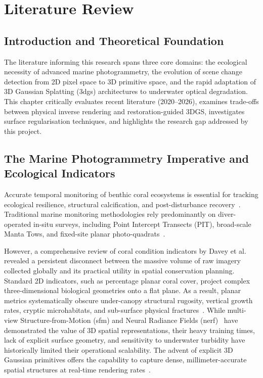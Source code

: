 
\chapter{Literature Review}
\label{chap:lit_review}

\section{Introduction and Theoretical Foundation}
\label{sec:lit_intro}
The literature informing this research spans three core domains: the ecological necessity of advanced marine photogrammetry, the evolution of scene change detection from 2D pixel space to 3D primitive space, and the rapid adaptation of 3D Gaussian Splatting (\gls{3dgs}) architectures to underwater optical degradation. This chapter critically evaluates recent literature (2020–2026), examines trade-offs between physical inverse rendering and restoration-guided 3DGS, investigates surface regularisation techniques, and highlights the research gap addressed by this project.

\section{The Marine Photogrammetry Imperative and Ecological Indicators}
\label{sec:lit_marine}
Accurate temporal monitoring of benthic coral ecosystems is essential for tracking ecological resilience, structural calcification, and post-disturbance recovery~\cite{souter2020status}. Traditional marine monitoring methodologies rely predominantly on diver-operated in-situ surveys, including Point Intercept Transects (PIT), broad-scale Manta Tows, and fixed-site planar photo-quadrats~\cite{icri2021monitoring}. 

However, a comprehensive review of coral condition indicators by Davey et al.~\cite{davey2025review} revealed a persistent disconnect between the massive volume of raw imagery collected globally and its practical utility in spatial conservation planning. Standard 2D indicators, such as percentage planar coral cover, project complex three-dimensional biological geometries onto a flat plane. As a result, planar metrics systematically obscure under-canopy structural rugosity, vertical growth rates, cryptic microhabitats, and sub-surface physical fractures~\cite{davey2025review}. While multi-view Structure-from-Motion (\gls{sfm}) and Neural Radiance Fields (\gls{nerf})~\cite{10203316} have demonstrated the value of 3D spatial representations, their heavy training times, lack of explicit surface geometry, and sensitivity to underwater turbidity have historically limited their operational scalability. The advent of explicit 3D Gaussian primitives offers the capability to capture dense, millimeter-accurate spatial structures at real-time rendering rates~\cite{10897713}.

